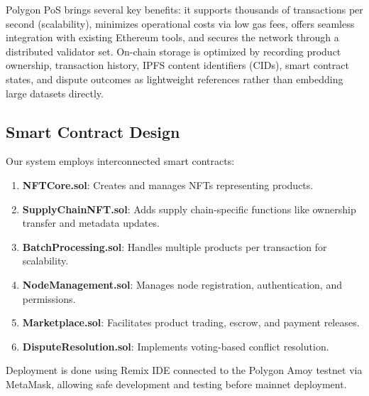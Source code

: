 \documentclass[conference]{IEEEtran}
\begin{document}
Polygon PoS brings several key benefits: it supports thousands of transactions per second (scalability), minimizes operational costs via low gas fees, offers seamless integration with existing Ethereum tools, and secures the network through a distributed validator set. On-chain storage is optimized by recording product ownership, transaction history, IPFS content identifiers (CIDs), smart contract states, and dispute outcomes as lightweight references rather than embedding large datasets directly.

\subsection{Smart Contract Design}

Our system employs interconnected smart contracts:

\begin{enumerate} \item \textbf{NFTCore.sol}: Creates and manages NFTs representing products. \item \textbf{SupplyChainNFT.sol}: Adds supply chain-specific functions like ownership transfer and metadata updates. \item \textbf{BatchProcessing.sol}: Handles multiple products per transaction for scalability. \item \textbf{NodeManagement.sol}: Manages node registration, authentication, and permissions. \item \textbf{Marketplace.sol}: Facilitates product trading, escrow, and payment releases. \item \textbf{DisputeResolution.sol}: Implements voting-based conflict resolution. \end{enumerate}

Deployment is done using Remix IDE connected to the Polygon Amoy testnet via MetaMask, allowing safe development and testing before mainnet deployment.
\end{document}

